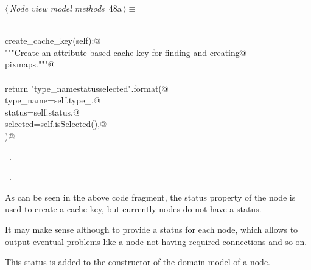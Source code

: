 \documentclass[
    a4paper,      %
    10pt,         %
    openright,    %
    notitlepage,  %
    parskip=half, %
]{scrreprt}       %
\theoremstyle{definition}                    %
\begin{document}
\begin{flushleft} \small
\begin{minipage}{\linewidth}\label{scrap66}\raggedright\small
{} $\langle\,${\itshape Node view model methods}\nobreak\ {\footnotesize {48a}}$\,\rangle\equiv$
\vspace{-1exm}
\begin{list}{}{} \item
\mbox{}\lstinline@@\\
\mbox{}\lstinline@def create_cache_key(self):@\\
\mbox{}\lstinline@    """Create an attribute based cache key for finding and creating@\\
\mbox{}\lstinline@    pixmaps."""@\\
\mbox{}\lstinline@@\\
\mbox{}\lstinline@    return "{type_name}{status}{selected}".format(@\\
\mbox{}\lstinline@        type_name=self.type_,@\\
\mbox{}\lstinline@        status=self.status,@\\
\mbox{}\lstinline@        selected=self.isSelected(),@\\
\mbox{}\lstinline@    )@\\
\mbox{}\lstinline@@{\NWsep}
\end{list}
\vspace{-1.5ex}
\footnotesize
\begin{list}{}{\setlength{\itemsep}{-\parsep}\setlength{\itemindent}{-\leftmargin}}
\item \NWtxtMacroDefBy\ .
\item \NWtxtMacroRefIn\ .

\item{}
\end{list}
\end{minipage}\vspace{4ex}
\end{flushleft}
As can be seen in the above code fragment, the status property of the node is
used to create a cache key, but currently nodes do not have a status.

It may make sense although to provide a status for each node, which allows to
output eventual problems like a node not having required connections and so on.

This status is added to the constructor of the domain model of a node.
\end{document}
